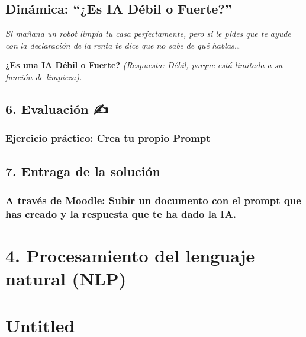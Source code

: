 \documentclass[
  spanish,
  letterpaper,
  DIV=11,
  numbers=noendperiod,
  oneside]{scrreprt}
\begin{document}
\section{Dinámica: ``¿Es IA Débil o
Fuerte?''}\label{dinuxe1mica-es-ia-duxe9bil-o-fuerte}

\emph{Si mañana un robot limpia tu casa perfectamente, pero si le pides
que te ayude con la declaración de la renta te dice que no sabe de qué
hablas\ldots{}}

\textbf{¿Es una IA Débil o Fuerte?} \emph{(Respuesta: Débil, porque está
limitada a su función de limpieza).}

\section{6. Evaluación ✍️}\label{evaluaciuxf3n-1}

\subsection{Ejercicio práctico: Crea tu propio
Prompt}\label{ejercicio-pruxe1ctico-crea-tu-propio-prompt-1}

\section{7. Entraga de la solución}\label{entraga-de-la-soluciuxf3n-1}

\subsection{A través de Moodle: Subir un documento con el prompt que has
creado y la respuesta que te ha dado la
IA.}\label{a-travuxe9s-de-moodle-subir-un-documento-con-el-prompt-que-has-creado-y-la-respuesta-que-te-ha-dado-la-ia.-1}

\chapter{}\label{section}

\chapter{4. Procesamiento del lenguaje natural
(NLP)}\label{procesamiento-del-lenguaje-natural-nlp}

\chapter{Untitled}\label{untitled}
\end{document}
